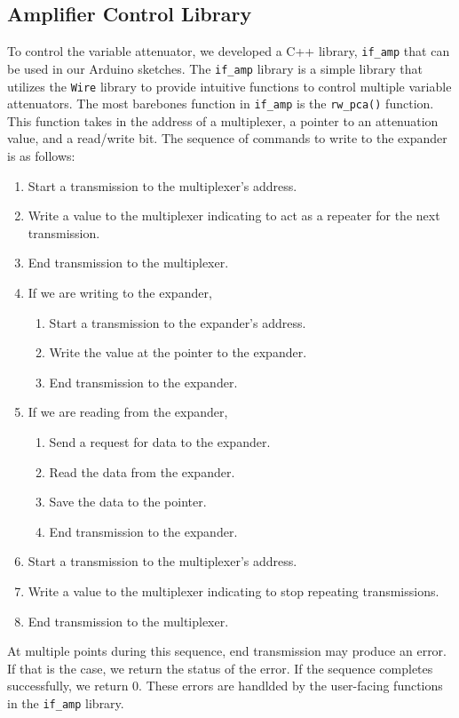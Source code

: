 \subsection{Amplifier Control Library}
To control the variable attenuator, we developed a C++ library, \texttt{if\_amp} that can be used in our Arduino sketches.
The \texttt{if\_amp} library is a simple library that utilizes the \texttt{Wire} library to provide intuitive functions to control multiple variable attenuators.
The most barebones function in \texttt{if\_amp} is the \texttt{rw\_pca()} function.
This function takes in the address of a multiplexer, a pointer to an attenuation value, and a read/write bit.
The sequence of commands to write to the expander is as follows:
\begin{enumerate}
    \item Start a transmission to the multiplexer's address.
    \item Write a value to the multiplexer indicating to act as a repeater for the next transmission.
    \item End transmission to the multiplexer.
    \item If we are writing to the expander,
    \begin{enumerate}
        \item Start a transmission to the expander's address.
        \item Write the value at the pointer to the expander.
        \item End transmission to the expander.
    \end{enumerate}
    \item If we are reading from the expander,
    \begin{enumerate}
        \item Send a request for data to the expander.
        \item Read the data from the expander.
        \item Save the data to the pointer.
        \item End transmission to the expander.
    \end{enumerate}
    \item Start a transmission to the multiplexer's address.
    \item Write a value to the multiplexer indicating to stop repeating transmissions.
    \item End transmission to the multiplexer.
\end{enumerate}
At multiple points during this sequence, end transmission may produce an error. 
If that is the case, we return the status of the error.
If the sequence completes successfully, we return 0.
These errors are handlded by the user-facing functions in the \texttt{if\_amp} library.

